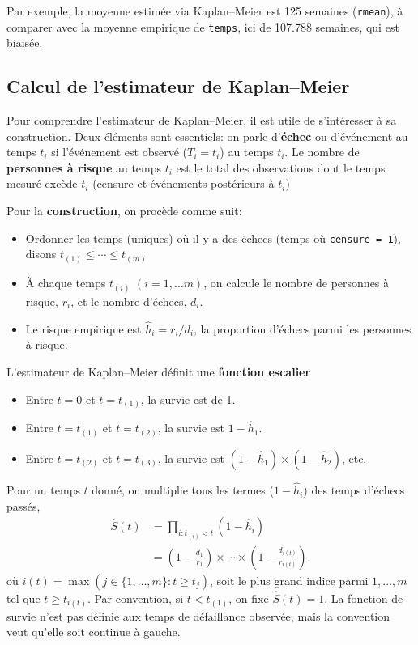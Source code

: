 \documentclass[
  11pt,
  letterpaper,
]{scrbook}
\providecommand{\tightlist}{%
  \setlength{\itemsep}{0pt}\setlength{\parskip}{0pt}}\usepackage{longtable,booktabs,array}
\theoremstyle{definition}
\theoremstyle{remark}
\begin{document}
Par exemple, la moyenne estimée via Kaplan--Meier est 125 semaines
(\texttt{rmean}), à comparer avec la moyenne empirique de
\texttt{temps}, ici de 107.788 semaines, qui est biaisée.

\hypertarget{calcul-de-lestimateur-de-kaplanmeier}{%
\subsection{Calcul de l'estimateur de
Kaplan--Meier}\label{calcul-de-lestimateur-de-kaplanmeier}}

Pour comprendre l'estimateur de Kaplan--Meier, il est utile de
s'intéresser à sa construction. Deux éléments sont essentiels: on parle
d'\textbf{échec} ou d'événement au temps \(t_i\) si l'événement est
observé (\(T_i=t_i\)) au temps \(t_i\). Le nombre de \textbf{personnes à
risque} au temps \(t_i\) est le total des observations dont le temps
mesuré excède \(t_i\) (censure et événements postérieurs à \(t_i\))

Pour la \textbf{construction}, on procède comme suit:

\begin{itemize}
\tightlist
\item
  Ordonner les temps (uniques) où il y a des échecs (temps où
  \texttt{censure\ =\ 1}), disons \(t_{(1)} \leq \cdots \leq t_{(m)}\)
\item
  À chaque temps \(t_{(i)}\) \((i=1, \ldots m)\), on calcule le nombre
  de personnes à risque, \(r_i\), et le nombre d'échecs, \(d_i\).
\item
  Le risque empirique est \(\widehat{h}_i = r_i/d_i\), la proportion
  d'échecs parmi les personnes à risque.
\end{itemize}

L'estimateur de Kaplan--Meier définit une \textbf{fonction escalier}

\begin{itemize}
\tightlist
\item
  Entre \(t=0\) et \(t=t_{(1)}\), la survie est de 1.
\item
  Entre \(t=t_{(1)}\) et \(t=t_{(2)}\), la survie est
  \(1-\widehat{h}_1\).
\item
  Entre \(t=t_{(2)}\) et \(t=t_{(3)}\), la survie est
  \((1-\widehat{h}_1) \times (1-\widehat{h}_2)\), etc.
\end{itemize}

Pour un temps \(t\) donné, on multiplie tous les termes
(\(1-\widehat{h}_i\)) des temps d'échecs passés, \begin{align*}
 \widehat{S}(t) &= \prod_{i: t_{(i)} < t} \left( 1- \widehat{h}_i\right) \\ &= \left( 1- \frac{d_1}{r_1}\right) \times \cdots \times \left( 1- \frac{d_{i(t)}}{r_{i(t)}}\right).
\end{align*} où \(i(t) =\max(j \in \{1, \ldots, m\}: t \geq t_{j})\),
soit le plus grand indice parmi \(1, \ldots, m\) tel que
\(t \geq t_{i(t)}\). Par convention, si \(t < t_{(1)}\), on fixe
\(\widehat{S}(t)=1\). La fonction de survie n'est pas définie aux temps
de défaillance observée, mais la convention veut qu'elle soit continue à
gauche.
\end{document}
